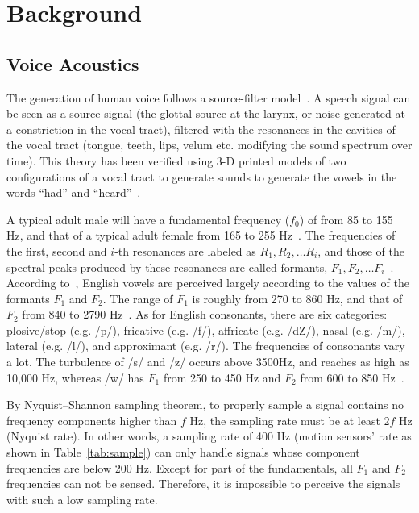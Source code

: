 
\section{Background}\label{sec:background}

\subsection{Voice Acoustics}\label{sec:voice}

The generation of human voice follows a source-filter model~\cite{fant1960acoustic}. A speech signal can be seen as a source signal (the glottal source at the larynx, or noise generated at a constriction in the vocal tract), filtered with the resonances in the cavities of the vocal tract (tongue, teeth, lips, velum etc. modifying the sound spectrum over time). This theory has been verified using 3-D printed models of two configurations of a vocal tract to generate sounds to generate the vowels in the words ``had'' and ``heard''~\cite{wolfe2016experimentally}. 

A typical adult male will have a fundamental frequency  ($f_0$) of from 85 to 155 Hz, and that of a typical adult female from 165 to 255 Hz~\cite{baken1987clinical,titze1994principles}. The frequencies of the first, second and $i$-th resonances are labeled as  $R_1, R_2, \ldots R_i$, and those of the spectral peaks produced by these resonances are called formants, $F_1, F_2, \ldots F_i $~\cite{titze2015toward}. 
%
According to~\cite{ladefoged2014course}, English vowels are perceived largely according to the values of the formants $F_1$ and $F_2$. The range of $F_1$ is roughly from 270 to 860 Hz, and that of $F_2$ from 840 to 2790 Hz~\cite{peterson1952control}. As for English consonants, there are six categories: plosive/stop (e.g. /p/), fricative (e.g. /f/), affricate (e.g. /dZ/), nasal (e.g. /m/), lateral (e.g. /l/), and approximant (e.g. /r/). The frequencies of consonants vary a lot. The turbulence of /s/ and /z/ occurs above 3500Hz, and reaches as high as 10,000 Hz, whereas /w/ has $F_1$ from 250 to 450 Hz and $F_2 $ from 600 to 850 Hz~\cite{ladefoged2012vowels}. 

By Nyquist–Shannon sampling theorem, to properly sample a signal contains no frequency components higher than $f$ Hz, the sampling rate must be at least $2f$ Hz (Nyquist rate). In other words, a sampling rate of 400 Hz (motion sensors' rate as shown in Table~\ref{tab:sample}) can only handle signals whose component frequencies are below 200 Hz. Except for part of the fundamentals, all $F_1$ and $F_2$ frequencies can not be sensed. Therefore, it is impossible to perceive the signals with such a low sampling rate.
%


